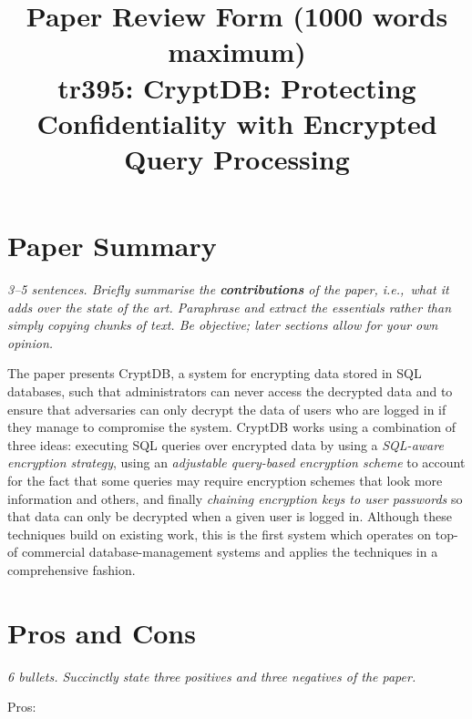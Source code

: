 \documentclass[11pt]{article}
\begin{document}

\title{Paper Review Form (1000 words maximum)\\
    tr395: CryptDB: Protecting Confidentiality with Encrypted Query Processing \cite{CryptDB}}
\maketitle

\section*{Paper Summary}

\textsl{3--5 sentences. Briefly summarise the {\bf contributions} of the paper,
i.e.,~what it adds over the state of the art. Paraphrase and extract the
essentials rather than simply copying chunks of text. Be objective; later
sections allow for your own opinion.}

The paper presents CryptDB, a system for encrypting data stored in SQL
databases, such that administrators can never access the decrypted data and to
ensure that adversaries can only decrypt the data of users who are logged in if
they manage to compromise the system. CryptDB works using a combination of
three ideas: executing SQL queries over encrypted data by using a
\textit{SQL-aware encryption strategy}, using an \textit{adjustable query-based
encryption scheme} to account for the fact that some queries may require
encryption schemes that look more information and others, and finally
\textit{chaining encryption keys to user passwords} so that data can only be
decrypted when a given user is logged in. Although these techniques build on
existing work, this is the first system which operates on top-of commercial
database-management systems and applies the techniques in a comprehensive
fashion.

\section*{Pros and Cons}


\textsl{6 bullets. Succinctly state three positives and three negatives of the
paper.}

Pros:
\end{document}
